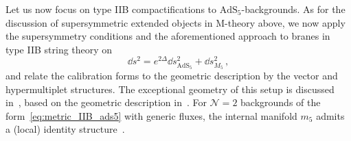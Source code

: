 \documentclass[debug]{phd}
\begin{document}
Let us now focus on type IIB compactifications to $\mathrm{AdS}_5$-backgrounds. 
As for the discussion of supersymmetric extended objects in M-theory above, we now apply the supersymmetry conditions and the aforementioned approach to branes in type IIB string theory on 
%
	\begin{equation} 
	\label{eq:metric_IIB_ads5}
		\dd  s^2= e^{2\Delta} \dd  s^2_{\mathrm{AdS}_5} + \dd  s^2_{M_5}\, ,
	\end{equation} 
%
and relate the calibration forms to the geometric description by the vector and hypermultiplet structures. 
%
%
The exceptional geometry of this setup is discussed in~\cite{AshmoreESE,Grana_Ntokos}, based on the geometric description in~\cite{Gauntlett:2005ww}. 
For $\mathcal{N}=2$ backgrounds of the form~\eqref{eq:metric_IIB_ads5} with generic fluxes, the internal manifold $m_5$ admits a (local) identity structure~\cite{Gauntlett:2005ww,GGPSW09, GGPSW09_02}. 
\end{document}
